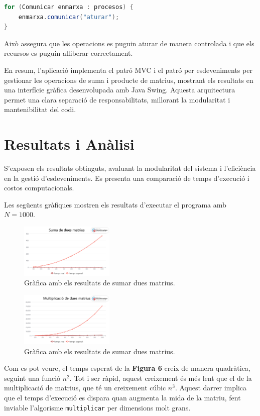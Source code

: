 \documentclass{ieeetj}
\begin{document}
\begin{lstlisting}[language=Java, basicstyle=\ttfamily\normalsize]
for (Comunicar enmarxa : procesos) {
    enmarxa.comunicar("aturar");
}
\end{lstlisting}

Això assegura que les operacions es puguin aturar de manera controlada i que els recursos es puguin alliberar correctament.

En resum, l'aplicació implementa el patró MVC i el patró per esdeveniments per gestionar les operacions de suma i producte de matrius, mostrant els resultats en una interfície gràfica desenvolupada amb Java Swing. Aquesta arquitectura permet una clara separació de responsabilitats, millorant la modularitat i mantenibilitat del codi.

\section{Resultats i Anàlisi}
S'exposen els resultats obtinguts, avaluant la modularitat del sistema i l’eficiència en la gestió d'esdeveniments. Es presenta una comparació de temps d’execució i costos computacionals.

Les següents gràfiques mostren els resultats d'executar el programa amb $N = 1000$.
\begin{figure}[htbp]
\centerline{\includegraphics[width=0.4\textwidth]{png/figuera6.png}}
\caption{Gràfica amb els resultats de sumar dues matrius.}
\label{fig:int2}
\end{figure}

\begin{figure}[htbp]
\centerline{\includegraphics[width=0.4\textwidth]{png/figuera7.png}}
\caption{Gràfica amb els resultats de sumar dues matrius.}
\label{fig:int2}
\end{figure}
Com es pot veure, el temps esperat de la \textbf{Figura 6} creix de manera quadràtica, seguint una funció $n^2$. Tot i ser ràpid, aquest creixement és més lent que el de la multiplicació de matrius, que té un creixement cúbic $n^3$. Aquest darrer implica que el temps d'execució es dispara quan augmenta la mida de la matriu, fent inviable l'algorisme \texttt{multiplicar} per dimensions molt grans.
\end{document}
